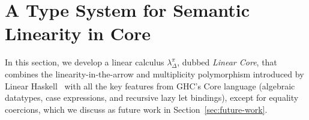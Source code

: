 \documentclass[acmsmall,review,anonymous,screen]{acmart}
\begin{document}
  

\section{A Type System for Semantic Linearity in Core\label{sec:main:linear-core}}

In this section, we develop a linear calculus $\lambda_\Delta^\pi$,
dubbed \emph{Linear Core}, that combines the linearity-in-the-arrow
and multiplicity polymorphism introduced by Linear
Haskell~\cite{cite:linearhaskell} with all the key features from GHC's Core
language (algebraic datatypes, case expressions, and recursive lazy let bindings),
except for equality coercions, which we discuss as future work in
Section~\ref{sec:future-work}.
%
\end{document}

